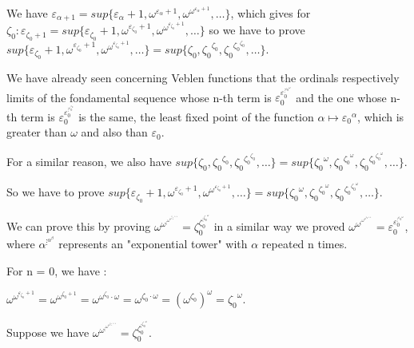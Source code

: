 \documentclass[10pt]{article}
\begin{document}
We have \( \varepsilon_{\alpha+1} = sup \lbrace \varepsilon_\alpha+1, \omega^{\varepsilon_\alpha+1}, \omega^{\omega^{\varepsilon_\alpha+1}}, \ldots \rbrace \), which gives for \( \zeta_0 : \varepsilon_{\zeta_0+1} = sup \lbrace \varepsilon_{\zeta_0}+1, \omega^{\varepsilon_{\zeta_0}+1}, \omega^{\omega^{\varepsilon_{\zeta_0}+1}}, \ldots \rbrace \)
so we have to prove \( sup \lbrace \varepsilon_{\zeta_0}+1, \omega^{\varepsilon_{\zeta_0}+1}, \omega^{\omega^{\varepsilon_{\zeta_0}+1}}, \ldots \rbrace = sup \lbrace \zeta_0, {\zeta_0}^{\zeta_0}, {\zeta_0}^{{\zeta_0}^{\zeta_0}}, \ldots \rbrace \).

We have already seen concerning Veblen functions that the ordinals respectively limits of the fondamental sequence whose n-th term is \(\varepsilon_0^{\varepsilon_0^{\vdots^{{\varepsilon_0}^\omega}}} \) and the one whose n-th term is \( \varepsilon_0^{\varepsilon_0^{\vdots^{\varepsilon_0^{\varepsilon_0}}}} \) is the same, the least fixed point of the function \( \alpha \mapsto {\varepsilon_0}^\alpha \), which is greater than \( \omega \) and also than \( \varepsilon_0 \).

For a similar reason, we also have \( sup \lbrace \zeta_0, {\zeta_0}^{\zeta_0}, {\zeta_0}^{{\zeta_0}^{\zeta_0}}, \ldots \rbrace = sup \lbrace {\zeta_0}^\omega, {\zeta_0}^{{\zeta_0}^\omega}, {\zeta_0}^{{\zeta_0}^{{\zeta_0}^\omega}}, \ldots \rbrace \).

So we have to prove \(  sup \lbrace \varepsilon_{\zeta_0}+1, \omega^{\varepsilon_{\zeta_0}+1}, \omega^{\omega^{\varepsilon_{\zeta_0}+1}}, \ldots \rbrace = sup \lbrace {\zeta_0}^\omega, {\zeta_0}^{{\zeta_0}^\omega}, {\zeta_0}^{{\zeta_0}^{{\zeta_0}^\omega}}, \ldots \rbrace \).

We can prove this by proving \( \omega^{\omega^{\vdots^{\omega^{\omega^{\varepsilon_{\zeta_0}+1}}}}} = \zeta_0^{\zeta_0^{\vdots^{{\zeta_0}^\omega}}} \) in a similar way we proved \( \omega^{\omega^{\vdots^{\omega^{\omega^{\varepsilon_0+1}}}}} = \varepsilon_0^{\varepsilon_0^{\vdots^{{\varepsilon_0}^\omega}}} \), where \( \alpha^{\vdots^{\alpha^\beta}} \) represents an "exponential tower" with \( \alpha \) repeated n times.

For n = 0, we have : 

\( \omega^{\omega^{\varepsilon_{\zeta_0}+1}} = \omega^{\omega^{\zeta_0+1}} = \omega^{\omega^{\zeta_0} \cdot \omega} = \omega^{\zeta_0 \cdot \omega} = (\omega^{\zeta_0})^\omega = {\zeta_0}^\omega \).

Suppose we have \( \omega^{\omega^{\vdots^{\omega^{\omega^{\varepsilon_{\zeta_0}+1}}}}} = \zeta_0^{\zeta_0^{\vdots^{{\zeta_0}^\omega}}} \).
\end{document}
